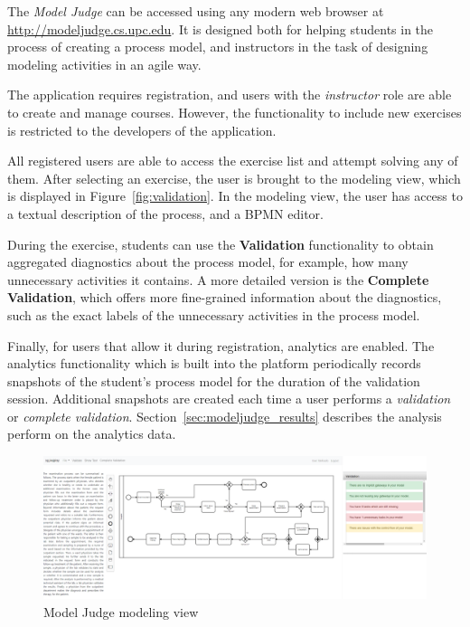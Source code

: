 The \emph{Model Judge} can be accessed using any modern web browser at
\url{http://modeljudge.cs.upc.edu}. It is designed both for helping students in
the process of creating a process model, and instructors in the task of
designing modeling activities in an agile way. 

The application requires registration, and users with the \emph{instructor} role
are able to create and manage courses. However, the functionality to include new
exercises is restricted to the developers of the application.

All registered users are able to access the exercise list and attempt solving
any of them. After selecting an exercise, the user is brought to the modeling
view, which is displayed in Figure~\ref{fig:validation}. In the modeling view,
the user has access to a textual description of the process, and a BPMN editor.

During the exercise, students can use the \textbf{Validation} functionality to
obtain aggregated diagnostics about the process model, for example, how many
unnecessary activities it contains. A more detailed version is the \textbf{Complete
  Validation}, which offers more fine-grained information about the diagnostics,
such as the exact labels of the unnecessary activities in the process model.

Finally, for users that allow it during registration, analytics are enabled. The
analytics functionality which is built into the platform periodically records
snapshots of the student's process model for the duration of the validation
session. Additional snapshots are created each time a user performs a
\textit{validation} or \textit{complete validation}.
Section~\ref{sec:modeljudge_results} describes the analysis perform on the
analytics data.

\begin{figure}[htb]
  \centering
  \includegraphics[width=\textwidth]{figures/validation}
  \caption{Model Judge modeling view}
  \label{fig:modeljudge_validation}
\end{figure}






